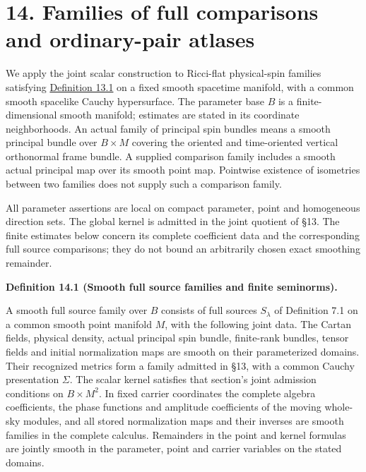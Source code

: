 \documentclass[
  english,
  11pt,
  reqno]{amsart}
\makeatletter
\newcommand{\pandocstatementheading}[1]{%
  \par\if@nobreak\else
    \addpenalty{\@beginparpenalty}%
    \addvspace{.5\baselineskip plus .2\baselineskip minus .2\baselineskip}%
  \fi
  {\normalfont\bfseries #1\par}%
  \nobreak\@afterindenttrue\@afterheading
}
\newcommand{\paperblockheading}[2][.45\baselineskip]{%
  \par\Needspace{6\baselineskip}%
  \addvspace{\baselineskip}%
  \noindent{\normalfont\bfseries #2}\par\nobreak
  \vskip#1\relax\nobreak
}
\makeatother
\begin{document}
\protect{}\label{sec:parameter-family-correspondence}

\section{14. Families of full comparisons and ordinary-pair
atlases}\label{families-of-full-comparisons-and-ordinary-pair-atlases}

We apply the joint scalar construction to Ricci-flat physical-spin
families satisfying
\hyperref[def:common-cauchy-metric-family]{Definition 13.1} on a fixed
smooth spacetime manifold, with a common smooth spacelike Cauchy
hypersurface. The parameter base \(B\) is a finite-dimensional smooth
manifold; estimates are stated in its coordinate neighborhoods. An
actual family of principal spin bundles means a smooth principal bundle
over \(B\times M\) covering the oriented and time-oriented vertical
orthonormal frame bundle. A supplied comparison family includes a smooth
actual principal map over its smooth point map. Pointwise existence of
isometries between two families does not supply such a comparison
family.

All parameter assertions are local on compact parameter, point and
homogeneous direction sets. The global kernel is admitted in the joint
quotient of §13. The finite estimates below concern its complete
coefficient data and the corresponding full source comparisons; they do
not bound an arbitrarily chosen exact smoothing remainder.

\paperblockheading[0pt]{Families on a fixed manifold.}

\pandocstatementheading{\protect{}\label{def:common-parent-source-families}Definition 14.1 (Smooth full source families and finite seminorms).}

A smooth full source family over \(B\) consists of full sources
\(S_\lambda\) of Definition 7.1 on a common smooth point manifold \(M\),
with the following joint data. The Cartan fields, physical density,
actual principal spin bundle, finite-rank bundles, tensor fields and
initial normalization maps are smooth on their parameterized domains.
Their recognized metrics form a family admitted in §13, with a common
Cauchy presentation \(\Sigma\). The scalar kernel satisfies that
section's joint admission conditions on \(B\times M^2\). In fixed
carrier coordinates the complete algebra coefficients, the phase
functions and amplitude coefficients of the moving whole-sky modules,
and all stored normalization maps and their inverses are smooth families
in the complete calculus. Remainders in the point and kernel formulas
are jointly smooth in the parameter, point and carrier variables on the
stated domains.
\end{document}
